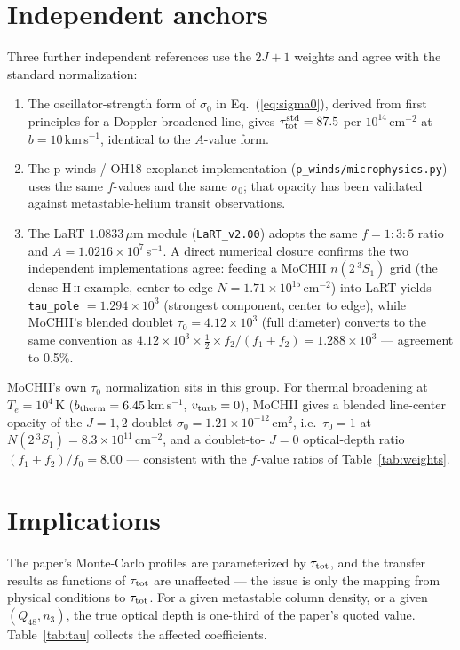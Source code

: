 \documentclass[english,a4paper]{my_memo}
\newcommand{\code}[1]{\texttt{#1}}
\newcommand{\tSSS}{2\,^3\!S_1}
\newcommand{\tautot}{\tau_{\rm tot}}
\begin{document}
\section{Independent anchors}
Three further independent references use the $2J+1$ weights and agree with
the standard normalization:
\begin{enumerate}\itemsep2pt
  \item The oscillator-strength form of $\sigma_0$ in
        Eq.~(\ref{eq:sigma0}), derived from first principles for a
        Doppler-broadened line, gives $\tautot^{\rm std} = 87.5$ per
        $10^{14}$\,cm$^{-2}$ at $b = 10$\,km\,s$^{-1}$, identical to the
        $A$-value form.
  \item The p-winds / OH18 exoplanet implementation
        (\code{p\_winds/microphysics.py}) uses the same $f$-values and the
        same $\sigma_0$; that opacity has been validated against
        metastable-helium transit observations.
  \item The LaRT $1.0833\,\mu$m module (\code{LaRT\_v2.00}) adopts the same
        $f = 1:3:5$ ratio and $A = 1.0216\times10^7$\,s$^{-1}$.  A direct
        numerical closure confirms the two independent implementations
        agree: feeding a MoCHII $n(\tSSS)$ grid (the dense H\,\textsc{ii}
        example, center-to-edge $N = 1.71\times10^{15}$\,cm$^{-2}$) into
        LaRT yields \code{tau\_pole} $= 1.294\times10^{3}$ (strongest
        component, center to edge), while MoCHII's blended doublet
        $\tau_0 = 4.12\times10^{3}$ (full diameter) converts to the same
        convention as $4.12\times10^{3} \times \tfrac{1}{2} \times
        f_2/(f_1{+}f_2) = 1.288\times10^{3}$ --- agreement to 0.5\%.
\end{enumerate}
MoCHII's own $\tau_0$ normalization sits in this group.  For thermal
broadening at $T_e = 10^4$\,K ($b_{\rm therm} = 6.45$\,km\,s$^{-1}$,
$v_{\rm turb} = 0$), MoCHII gives a blended line-center opacity of the
$J = 1, 2$ doublet $\sigma_0 = 1.21\times10^{-12}$\,cm$^2$, i.e.\
$\tau_0 = 1$ at $N(\tSSS) = 8.3\times10^{11}$\,cm$^{-2}$, and a doublet-to-
$J{=}0$ optical-depth ratio $(f_1+f_2)/f_0 = 8.00$ --- consistent with the
$f$-value ratios of Table~\ref{tab:weights}.

\section{Implications}
The paper's Monte-Carlo profiles are parameterized by $\tautot$, and the
transfer results as functions of $\tautot$ are unaffected --- the issue is
only the mapping from physical conditions to $\tautot$.  For a given
metastable column density, or a given $(Q_{48}, n_3)$, the true optical
depth is one-third of the paper's quoted value.  Table~\ref{tab:tau}
collects the affected coefficients.
\end{document}
